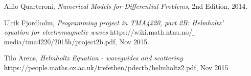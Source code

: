\documentclass[10pt,a4paper]{article}
\begin{document}



\begin{thebibliography}{}

Alfio Quarteroni, \emph{Numerical Models for Differential Problems}, 2nd Edition, 2014.

Ulrik Fjordholm, \emph{Programming project in TMA4220, part 2B:
Helmholtz' equation for electromagnetic waves} https://wiki.math.ntnu.no/$\_$media/tma4220/2015h/project2b.pdf, Nov 2015.

Tilo Arens, \emph{Helmholtz Equation - waveguides and scattering} https://people.maths.ox.ac.uk/trefethen/pdectb/helmholtz2.pdf, Nov 2015


\end{thebibliography}
\end{document}
